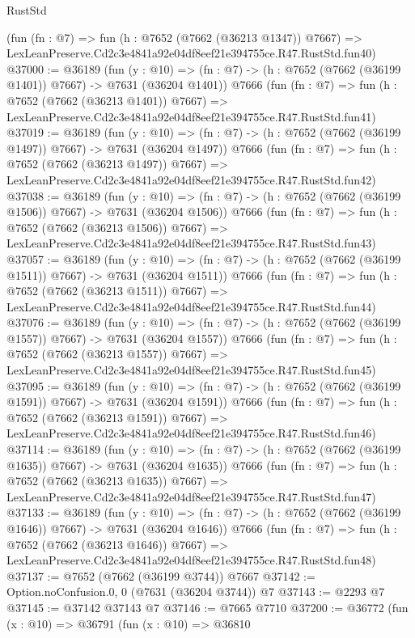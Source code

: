 \begin{lexlean}{RustStd}
\begin{coremodule}
    (fun (fn : @7) =>
    fun (h : @7652 (@7662 (@36213 @1347)) @7667) =>
    LexLeanPreserve.Cd2c3e4841a92e04df8eef21e394755ce.R47.RustStd.fun40)
@37000 := @36189
    (fun (y : @10) => (fn : @7) -> (h : @7652 (@7662 (@36199 @1401)) @7667) -> @7631 (@36204 @1401))
    @7666
    (fun (fn : @7) =>
    fun (h : @7652 (@7662 (@36213 @1401)) @7667) =>
    LexLeanPreserve.Cd2c3e4841a92e04df8eef21e394755ce.R47.RustStd.fun41)
@37019 := @36189
    (fun (y : @10) => (fn : @7) -> (h : @7652 (@7662 (@36199 @1497)) @7667) -> @7631 (@36204 @1497))
    @7666
    (fun (fn : @7) =>
    fun (h : @7652 (@7662 (@36213 @1497)) @7667) =>
    LexLeanPreserve.Cd2c3e4841a92e04df8eef21e394755ce.R47.RustStd.fun42)
@37038 := @36189
    (fun (y : @10) => (fn : @7) -> (h : @7652 (@7662 (@36199 @1506)) @7667) -> @7631 (@36204 @1506))
    @7666
    (fun (fn : @7) =>
    fun (h : @7652 (@7662 (@36213 @1506)) @7667) =>
    LexLeanPreserve.Cd2c3e4841a92e04df8eef21e394755ce.R47.RustStd.fun43)
@37057 := @36189
    (fun (y : @10) => (fn : @7) -> (h : @7652 (@7662 (@36199 @1511)) @7667) -> @7631 (@36204 @1511))
    @7666
    (fun (fn : @7) =>
    fun (h : @7652 (@7662 (@36213 @1511)) @7667) =>
    LexLeanPreserve.Cd2c3e4841a92e04df8eef21e394755ce.R47.RustStd.fun44)
@37076 := @36189
    (fun (y : @10) => (fn : @7) -> (h : @7652 (@7662 (@36199 @1557)) @7667) -> @7631 (@36204 @1557))
    @7666
    (fun (fn : @7) =>
    fun (h : @7652 (@7662 (@36213 @1557)) @7667) =>
    LexLeanPreserve.Cd2c3e4841a92e04df8eef21e394755ce.R47.RustStd.fun45)
@37095 := @36189
    (fun (y : @10) => (fn : @7) -> (h : @7652 (@7662 (@36199 @1591)) @7667) -> @7631 (@36204 @1591))
    @7666
    (fun (fn : @7) =>
    fun (h : @7652 (@7662 (@36213 @1591)) @7667) =>
    LexLeanPreserve.Cd2c3e4841a92e04df8eef21e394755ce.R47.RustStd.fun46)
@37114 := @36189
    (fun (y : @10) => (fn : @7) -> (h : @7652 (@7662 (@36199 @1635)) @7667) -> @7631 (@36204 @1635))
    @7666
    (fun (fn : @7) =>
    fun (h : @7652 (@7662 (@36213 @1635)) @7667) =>
    LexLeanPreserve.Cd2c3e4841a92e04df8eef21e394755ce.R47.RustStd.fun47)
@37133 := @36189
    (fun (y : @10) => (fn : @7) -> (h : @7652 (@7662 (@36199 @1646)) @7667) -> @7631 (@36204 @1646))
    @7666
    (fun (fn : @7) =>
    fun (h : @7652 (@7662 (@36213 @1646)) @7667) =>
    LexLeanPreserve.Cd2c3e4841a92e04df8eef21e394755ce.R47.RustStd.fun48)
@37137 := @7652 (@7662 (@36199 @3744)) @7667
@37142 := Option.noConfusion.{0, 0} (@7631 (@36204 @3744)) @7
@37143 := @2293 @7
@37145 := @37142 @37143 @7
@37146 := @7665 @7710
@37200 := @36772
    (fun (x : @10) =>
    @36791
      (fun (x : @10) =>
      @36810

\end{coremodule}
\end{lexlean}
